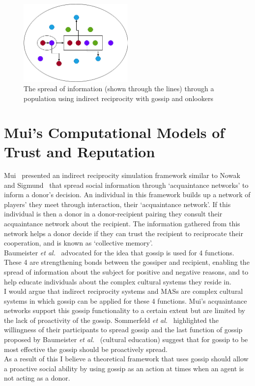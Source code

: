 \documentclass[]{final_report}
\begin{document}
\begin{figure}
	\center
	\includegraphics[width=0.5\textwidth]{Gossip_and_onlookers.png}
	\caption{The spread of information (shown through the lines) through a population using indirect reciprocity with gossip and onlookers}
	\label{fig:gossip_and_onlookers}
\end{figure}

\section{Mui's Computational Models of Trust and Reputation}
Mui~\cite{mui2002computational} presented an indirect reciprocity simulation framework similar to Nowak and Sigmund~\cite{evol_indirect_image} that spread social information through `acquaintance networks' to inform a donor's decision. An individual in this framework builds up a network of players' they meet through interaction, their `acquaintance network'. If this individual is then a donor in a donor-recipient pairing they consult their acquaintance network about the recipient. The information gathered from this network helps a donor decide if they can trust the recipient to reciprocate their cooperation, and is known as `collective memory'.\\
Baumeister \textit{et al.}~\cite{baumeister2004gossip} advocated for the idea that gossip is used for 4 functions. These 4 are strengthening bonds between the gossiper and recipient, enabling the spread of information about the subject for positive and negative reasons, and to help educate individuals about the complex cultural systems they reside in.\\
I would argue that indirect reciprocity systems and MASs are complex cultural systems in which gossip can be applied for these 4 functions. Mui's acquaintance networks support this gossip functionality to a certain extent but are limited by the lack of proactivity of the gossip. Sommerfeld \textit{et al.}~\cite{gossip_alt} highlighted the willingness of their participants to spread gossip and the last function of gossip proposed by Baumeister \textit{et al.}~\cite{baumeister2004gossip} (cultural education) suggest that for gossip to be most effective the gossip should be proactively spread.\\
As a result of this I believe a theoretical framework that uses gossip should allow a proactive social ability  by using gossip as an action at times when an agent is not acting as a donor. 
\end{document}
